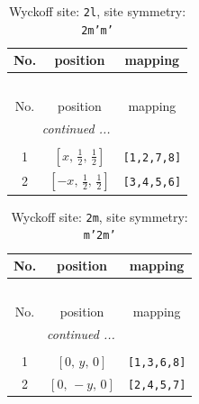 \documentclass[fleqn,8pt]{jsarticle}
\begin{document}
\renewcommand{\arraystretch}{1.2}
\begin{longtable}{ccc}
\caption{Wyckoff site: {\tt 2l}, site symmetry: {\tt 2m'm'}}
 \\
 \hline \hline
No. & position & mapping \\ \hline \endfirsthead

\multicolumn{2}{l}{\tablename\ \thetable{}} \\
 \hline \hline
No. & position & mapping \\ \hline \endhead

 \hline \hline
\multicolumn{2}{r}{\footnotesize\it continued ...} \\ \endfoot

 \hline \hline
\multicolumn{2}{r}{} \\ \endlastfoot

1 & $\left[ x,\, \frac{1}{2},\, \frac{1}{2} \right]$ & {\tt [1,2,7,8]} \\ \hline
2 & $\left[ - x,\, \frac{1}{2},\, \frac{1}{2} \right]$ & {\tt [3,4,5,6]} \\
\end{longtable}
\renewcommand{\arraystretch}{1.2}
\begin{longtable}{ccc}
\caption{Wyckoff site: {\tt 2m}, site symmetry: {\tt m'2m'}}
 \\
 \hline \hline
No. & position & mapping \\ \hline \endfirsthead

\multicolumn{2}{l}{\tablename\ \thetable{}} \\
 \hline \hline
No. & position & mapping \\ \hline \endhead

 \hline \hline
\multicolumn{2}{r}{\footnotesize\it continued ...} \\ \endfoot

 \hline \hline
\multicolumn{2}{r}{} \\ \endlastfoot

1 & $\left[ 0,\, y,\, 0 \right]$ & {\tt [1,3,6,8]} \\ \hline
2 & $\left[ 0,\, - y,\, 0 \right]$ & {\tt [2,4,5,7]} \\
\end{longtable}
\renewcommand{\arraystretch}{1.2}
\end{document}
